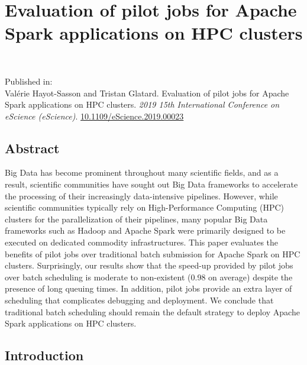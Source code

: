 \chapter{Evaluation of pilot jobs for Apache Spark applications on HPC
clusters}~\label{chp:spa}


\noindent
Published in: \\ 
Val\'erie Hayot-Sasson and Tristan Glatard. Evaluation of pilot jobs for Apache Spark applications on HPC
clusters. \textit{2019 15th International Conference on eScience
(eScience)}. \url{10.1109/eScience.2019.00023}



\section{Abstract}
	Big Data has become prominent throughout many scientific fields, and as
	a result, scientific communities have sought out Big Data frameworks to
	accelerate the processing of their increasingly data-intensive
	pipelines. However, while scientific communities typically rely on
	High-Performance Computing (HPC) clusters for the parallelization of
	their pipelines, many popular Big Data frameworks such as Hadoop and
	Apache Spark were primarily designed to be executed on dedicated
	commodity infrastructures. This paper evaluates the benefits of pilot
	jobs over traditional batch submission for Apache Spark on HPC clusters.
	Surprisingly, our results show that the speed-up provided by pilot jobs
	over batch scheduling is moderate to non-existent (0.98 on average)
	despite the presence of long queuing times. In addition, pilot jobs
	provide an extra layer of scheduling that complicates debugging and
	deployment. We conclude that traditional batch scheduling should remain
	the default strategy to deploy Apache Spark applications on HPC
	clusters.
    
    
    \section{Introduction}
    
